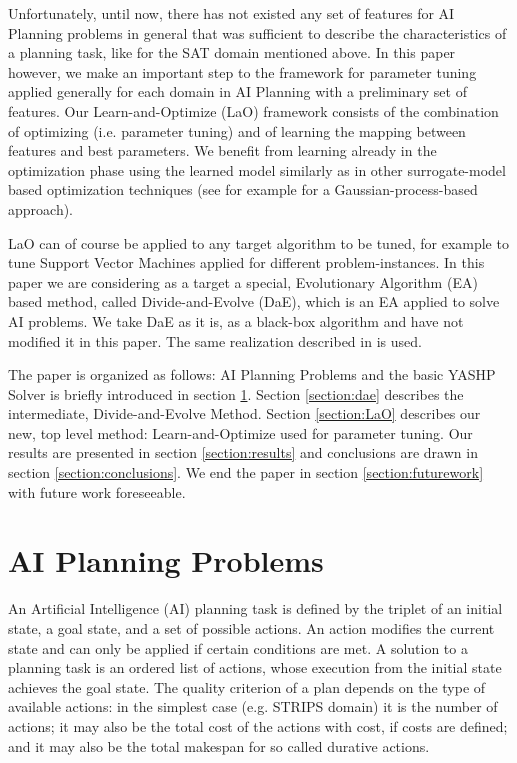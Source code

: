 \documentclass{MYsig-alternate}
\begin{document}
Unfortunately, until now, there has not existed any set of features for AI Planning problems in general that was sufficient to describe the characteristics of a planning task, like for the SAT domain \cite{Hutter06} mentioned above. In this paper however, we make an important step to the framework for parameter tuning applied generally for each domain in AI Planning with a preliminary set of features. Our Learn-and-Optimize (LaO) framework consists of the combination of optimizing (i.e. parameter tuning) and of learning the mapping between features and best parameters. We benefit from learning already in the optimization phase using the learned model similarly as in other surrogate-model based optimization techniques (see for example \cite{Bardenet} for a Gaussian-process-based approach).

LaO can of course be applied to any target algorithm to be tuned, for example to tune Support Vector Machines applied for different problem-instances. In this paper we are considering as a target a special, Evolutionary Algorithm (EA) based method, called Divide-and-Evolve (DaE), which is an EA applied to solve AI problems. We take DaE as it is, as a black-box algorithm and have not modified it in this paper. The same realization described in \cite{BibEvoCop:2010} is used. 

The paper is organized as follows: AI Planning Problems and the basic YASHP Solver is briefly introduced in section \ref{section:planning}. Section \ref{section:dae} describes the intermediate, Divide-and-Evolve Method. Section \ref{section:LaO} describes our new, top level method: Learn-and-Optimize used for parameter tuning. Our results are presented in section \ref{section:results} and conclusions are drawn in section \ref{section:conclusions}. We end the paper in section \ref{section:futurework} with future work foreseeable.

\section{AI Planning Problems}
\label{section:planning}

An Artificial Intelligence (AI) planning task is defined by the triplet of an initial state, a goal state, and a set of possible actions. An action modifies the current state and can only be applied if certain conditions are met. A solution to a planning task is an ordered list of actions, whose execution from the initial state achieves the goal state. The quality criterion of a plan depends on the type of available actions: in the simplest case (e.g. STRIPS domain) it is the number of actions; it may also be the total cost of the actions with cost, if costs are defined; and it may also be the total makespan for so called durative actions.
\end{document}
